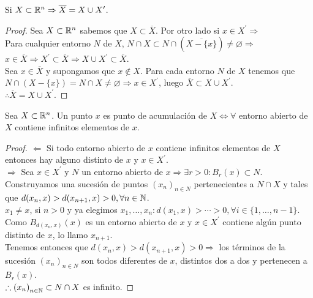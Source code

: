 \begin{prop}
  Si \(X \subset \mathbb{R}^n \Rightarrow \overline{X} = X \cup X^{\prime} \).
  \begin{proof}
    Sea \(X \subset \mathbb{R}^n\) sabemos que \(X \subset \overline{X} \). Por otro lado si \(x \in X^{\prime} \Rightarrow \) \\
    Para cualquier entorno \(N\) de \(X\), \(N \cap X \subset N \cap (\overline{X - \{x\}}) \neq \varnothing \Rightarrow \) \\
    \(x \in \overline{X} \Rightarrow X^{\prime} \subset \overline{X} \Rightarrow X \cup X^{\prime} \subset \overline{X} \). \\

    Sea \(x \in \overline{X} \) y supongamos que \(x \notin X\). Para cada entorno \(N\) de \(X\) tenemos que \(N \cap (X - \{x\}) = N \cap X \neq \varnothing \Rightarrow x \in X^{\prime} \), luego \(\overline{X} \subset X \cup X^{\prime} \). \\
    \(\therefore \overline{X} = X \cup X^{\prime} \).
  \end{proof}
\end{prop}

\clearpage

\begin{prop}
  Sea \(X \subset \mathbb{R}^n\). Un punto \(x\) es punto de acumulación de \(X \iff \forall \) entorno abierto de \(X\) contiene infinitos elementos de \(x\).

  \begin{proof}
    \(\Leftarrow \) Si todo entorno abierto de \(x\) contiene infinitos elementos de \(X\) entonces hay alguno distinto de \(x\) y \(x \in X^{\prime} \). \\
    \(\Rightarrow \) Sea \(x \in X^{\prime} \) y \(N\) un entorno abierto de \(x \Rightarrow \exists r > 0 : B_r(x) \subset N\). \\
    Construyamos una sucesión de puntos \({(x_n)}_{n \in N} \) pertenecientes a \(N \cap X\) y tales que \(d(x_n, x) > d(x_{n+1}, x) > 0, \forall n \in \mathbb{N} \). \\
    \(x_1 \neq x\), si \(n > 0\) y ya elegimos \(x_1, \ldots, x_n : d(x_1, x) > \cdots > 0, \forall i \in \{1, \ldots, n-1\} \). Como \(B_{d(x_n, x)}(x)\) es un entorno abierto de \(x\) y \(x \in X^{\prime} \) contiene algún punto distinto de \(x\), lo llamo \(x_{n+1} \). \\
    Tenemos entonces que \(d(x_n, x) > d(x_{n+1}, x) > 0 \Rightarrow \) los términos de la sucesión \({(x_n)}_{n \in N} \) son todos diferentes de \(x\), distintos dos a dos y pertenecen a \(B_r(x)\). \\
    \(\therefore {(x_n)}_{n \in \mathbb{N}} \subset N \cap X\) es infinito.
  \end{proof}
\end{prop}

